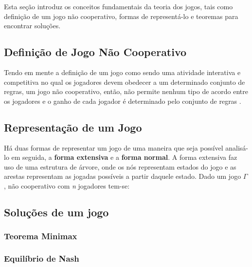 Esta seção introduz os conceitos fundamentais da teoria dos jogos, tais como definição de um jogo não cooperativo, formas de representá-lo e teoremas para encontrar soluções.

\subsection{Definição de Jogo Não Cooperativo}
\label{subsec:definicao-de-jogo-nao-cooperativo}

Tendo em mente a definição de um jogo como sendo uma atividade interativa e competitiva no qual os jogadores devem obedecer a um determinado conjunto de regras, um jogo não cooperativo, então, não permite nenhum tipo de acordo entre os jogadores e o ganho de cada jogador é determinado pelo conjunto de regras \cite{jones_1980}.


\subsection{Representação de um Jogo}
\label{subsec:representacao-de-um-jogo}

Há duas formas de representar um jogo de uma maneira que seja possível analisá-lo em seguida, a \textbf{forma extensiva} e a \textbf{forma normal}. A forma extensiva faz uso de uma estrutura de árvore, onde os nós representam estados do jogo e as arestas representam as jogadas possíveis a partir daquele estado. Dado um jogo $\Gamma$, não cooperativo com \emph{n} jogadores tem-se:




\subsection{Soluções de um jogo}
\label{sec:solucoes-de-um-jogo}

\subsubsection{Teorema Minimax}
\label{subsubsec:teorema-minimax}

\subsubsection{Equilíbrio de Nash}
\label{subsubsec:equilibrio-de-nash}

